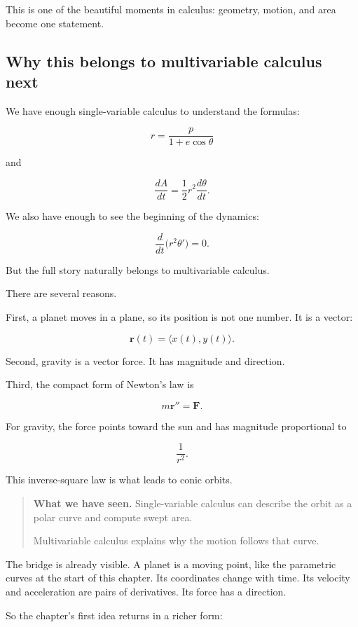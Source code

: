 This is one of the beautiful moments in calculus: geometry, motion, and area become
one statement.

\subsection{Why this belongs to multivariable calculus next}
\label{subsec:planetary-motion-next-multivariable}

We have enough single-variable calculus to understand the formulas:

\[
r=\frac{p}{1+e\cos\theta}
\]

and

\[
\frac{dA}{dt}=\frac12 r^2\frac{d\theta}{dt}.
\]

We also have enough to see the beginning of the dynamics:

\[
\frac{d}{dt}\bigl(r^2\theta'\bigr)=0.
\]

But the full story naturally belongs to multivariable calculus.

There are several reasons.

First, a planet moves in a plane, so its position is not one number.  It is a vector:

\[
\mathbf r(t)=\langle x(t),y(t)\rangle.
\]

Second, gravity is a vector force.  It has magnitude and direction.

Third, the compact form of Newton's law is

\[
m\mathbf r''=\mathbf F.
\]

For gravity, the force points toward the sun and has magnitude proportional to

\[
\frac{1}{r^2}.
\]

This inverse-square law is what leads to conic orbits.

\begin{quote}
\textbf{What we have seen.}
Single-variable calculus can describe the orbit as a polar curve and compute swept area.

Multivariable calculus explains why the motion follows that curve.
\end{quote}

The bridge is already visible.  A planet is a moving point, like the parametric curves at
the start of this chapter.  Its coordinates change with time.  Its velocity and acceleration
are pairs of derivatives.  Its force has a direction.

So the chapter's first idea returns in a richer form:

